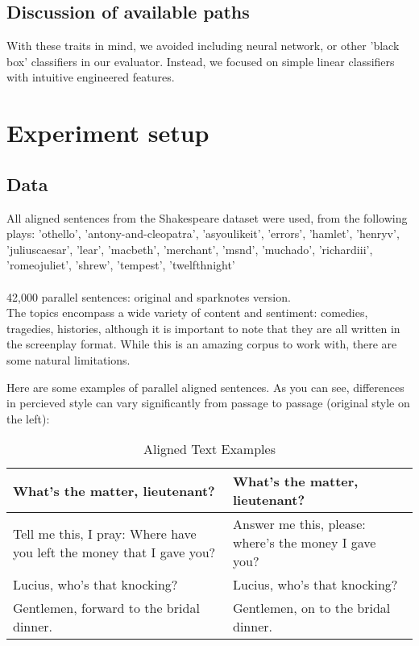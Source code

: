 \documentclass[letterpaper, 10 pt, conference]{ieeeconf}  %
\begin{document}
  \subsection{Discussion of available paths} 
  With these traits in mind, we avoided including neural network, or other 'black box' classifiers in our evaluator. Instead, we focused on simple linear classifiers with intuitive engineered features. 


\section{Experiment setup}
  
  \subsection{Data}

  All aligned sentences from the Shakespeare dataset were used, from the following plays: 'othello', 'antony-and-cleopatra', 'asyoulikeit', 
                       'errors', 'hamlet', 'henryv', 'juliuscaesar', 'lear', 'macbeth', 
                       'merchant', 'msnd', 'muchado', 'richardiii', 'romeojuliet', 
                       'shrew', 'tempest', 'twelfthnight'
\\ \\
  42,000 parallel sentences: original and sparknotes version.
\\
  The topics encompass a wide variety of content and sentiment: comedies, tragedies, histories, although it is important to note that they are all written in the screenplay format. While this is an amazing corpus to work with, there are some natural limitations.

  Here are some examples of parallel aligned sentences. As you can see, differences in percieved style can vary significantly from passage to passage (original style on the left):


  \begin{table}[h]
    \caption{Aligned Text Examples}
    \label{table_example}
    \begin{center}
      \begin{tabular}{| p{3.5cm}  | p{3.5cm} |}
      \hline
      What's the matter, lieutenant? & What's the matter, lieutenant?\\
      \hline
      Tell me this, I pray: Where have you left the money that I gave you? & Answer me this, please: where's the money I gave you?\\
      \hline
      Lucius, who's that knocking? & Lucius, who's that knocking?\\
      \hline
      Gentlemen, forward to the bridal dinner. & Gentlemen, on to the bridal dinner.\\
      \hline
      \end{tabular}
    \end{center}
  \end{table}
\end{document}
